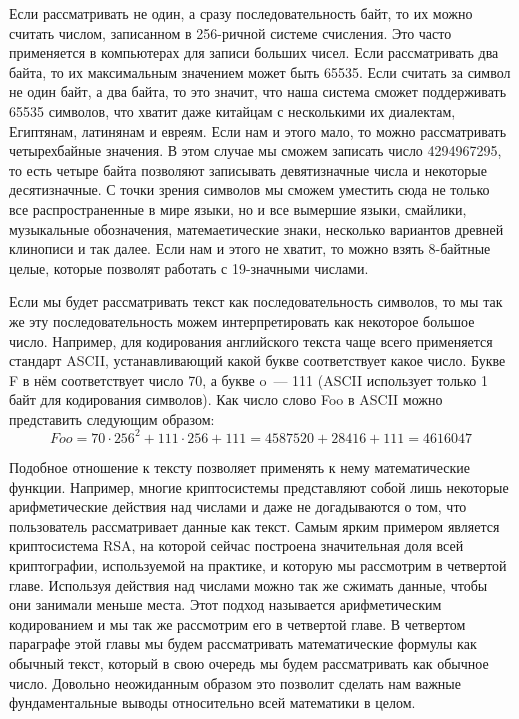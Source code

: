 Если рассматривать не один, а сразу последовательность байт, то их можно считать числом, записанном в 256-ричной системе счисления. Это часто применяется в компьютерах для записи больших чисел. Если рассматривать два байта, то их максимальным значением может быть 65535. Если считать за символ не один байт, а два байта, то это значит, что наша система сможет поддерживать 65535 символов, что хватит даже китайцам с несколькими их диалектам, Египтянам, латинянам и евреям. Если нам и этого мало, то можно рассматривать четырехбайные значения. В этом случае мы сможем записать число 4294967295, то есть четыре байта позволяют записывать девятизначные числа и некоторые десятизначные. С точки зрения символов мы сможем уместить сюда не только все распространенные в мире языки, но и все вымершие языки, смайлики, музыкальные обозначения, матемаетические знаки, несколько вариантов древней клинописи и так далее. Если нам и этого не хватит, то можно взять 8-байтные целые, которые позволят работать с 19-значными числами.

Если мы будет рассматривать текст как последовательность символов, то мы так же эту последовательность можем интерпретировать как некоторое большое число. Например, для кодирования английского текста чаще всего применяется стандарт ASCII, устанавливающий какой букве соответствует какое число. Букве F в нём соответствует число 70, а букве o~--- 111 (ASCII использует только 1 байт для кодирования символов). Как число слово Foo в ASCII можно представить следующим образом:
$$Foo = 70 \cdot 256^2 + 111 \cdot 256 + 111 = 4587520 + 28416 + 111 = 4616047$$

Подобное отношение к тексту позволяет применять к нему математические функции. Например, многие криптосистемы представляют собой лишь некоторые арифметические действия над числами и даже не догадываются о том, что пользователь рассматривает данные как текст. Самым ярким примером является криптосистема RSA, на которой сейчас построена значительная доля всей криптографии, используемой на практике, и которую мы рассмотрим в четвертой главе. Используя действия над числами можно так же сжимать данные, чтобы они занимали меньше места. Этот подход называется арифметическим кодированием и мы так же рассмотрим его в четвертой главе. В четвертом параграфе этой главы мы будем рассматривать математические формулы как обычный текст, который в свою очередь мы будем рассматривать как обычное число. Довольно неожиданным образом это позволит сделать нам важные фундаментальные выводы относительно всей математики в целом.


